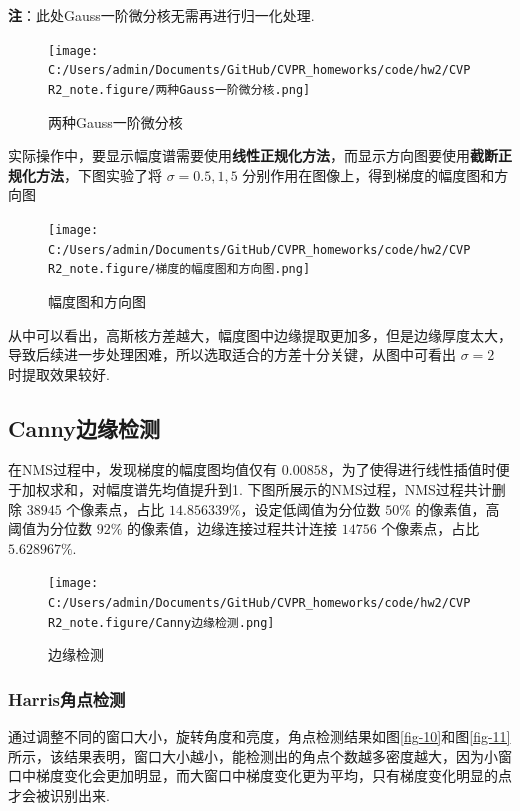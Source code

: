 \documentclass[12pt, a4paper, oneside]{ctexart}
\numberwithin{equation}{section}  %
\begin{document}
\textbf{注}：此处Gauss一阶微分核无需再进行归一化处理.

\begin{figure}[htbp]
    \centering
    \texttt{[image: C:/Users/admin/Documents/GitHub/CVPR\_homeworks/code/hw2/CVPR2\_note.figure/两种Gauss一阶微分核.png]}
    \caption{两种Gauss一阶微分核\label{fig-6}}
\end{figure}

实际操作中，要显示幅度谱需要使用\textbf{线性正规化方法}，而显示方向图要使用\textbf{截断正规化方法}，下图实验了将
\(\sigma=0.5, 1, 5\) 分别作用在图像上，得到梯度的幅度图和方向图

\begin{figure}[htbp]
    \centering
    \hspace*{-1.5cm}
    \texttt{[image: C:/Users/admin/Documents/GitHub/CVPR\_homeworks/code/hw2/CVPR2\_note.figure/梯度的幅度图和方向图.png]}
    \caption{幅度图和方向图\label{fig-7}}
\end{figure}

从中可以看出，高斯核方差越大，幅度图中边缘提取更加多，但是边缘厚度太大，导致后续进一步处理困难，所以选取适合的方差十分关键，从图中可看出
\(\sigma=2\) 时提取效果较好.

\subsection{Canny边缘检测}
在NMS过程中，发现梯度的幅度图均值仅有
\(0.00858\)，为了使得进行线性插值时便于加权求和，对幅度谱先均值提升到1.
下图所展示的NMS过程，NMS过程共计删除 \(38945\) 个像素点，占比
\(14.856339\%\)，设定低阈值为分位数 \(50\%\) 的像素值，高阈值为分位数
\(92\%\) 的像素值，边缘连接过程共计连接 \(14756\) 个像素点，占比
\(5.628967\%\).

\begin{figure}[htbp]
    \centering
    \texttt{[image: C:/Users/admin/Documents/GitHub/CVPR\_homeworks/code/hw2/CVPR2\_note.figure/Canny边缘检测.png]}
    \caption{边缘检测\label{fig-8}}
\end{figure}
\vspace*{-1cm}
\subsubsection{Harris角点检测}
通过调整不同的窗口大小，旋转角度和亮度，角点检测结果如图\ref{fig-10}和图\ref{fig-11}所示，该结果表明，窗口大小越小，能检测出的角点个数越多密度越大，因为小窗口中梯度变化会更加明显，而大窗口中梯度变化更为平均，只有梯度变化明显的点才会被识别出来.
\end{document}
